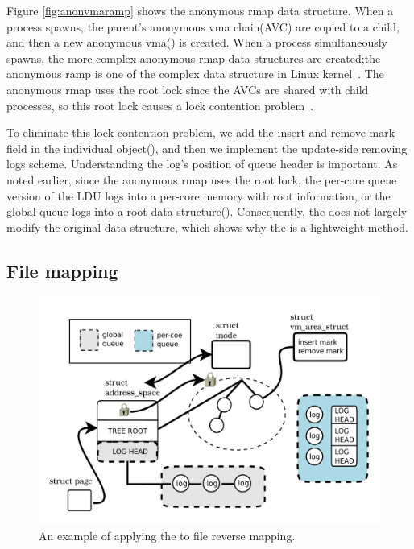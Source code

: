 Figure \ref{fig:anonvmaramp} shows the anonymous rmap data structure.
When a process spawns, the parent's anonymous vma chain(AVC) are copied
to a child, and then a new anonymous vma() is created.
When a process simultaneously spawns, the more complex
anonymous rmap data structures are created;the anonymous ramp is one of the complex data
structure in Linux kernel~\cite{CorbetLWNANON}.
The anonymous rmap uses the root lock since the AVCs are shared with child processes, so this root lock causes a lock contention problem~\cite{Andi2011adding}.

To eliminate this lock contention problem, we add the insert and
remove mark field in the individual object(),
and then we implement the update-side removing logs scheme.
Understanding the log's position of queue header is important.
As noted earlier, since the anonymous rmap uses the root lock, the per-core queue version of
the LDU logs into a per-core memory with root information, or the global
queue logs into a root data structure().
Consequently, the \LDU does not largely modify the original data
structure, which shows why the \LDU is a lightweight method.

\subsection{File mapping}

\begin{figure}[tb]
  \begin{center}
     \includegraphics[width=1\textwidth,height=1\textheight,keepaspectratio]{fig/file_rmap}
  \end{center}
  \caption{An example of applying the \LDU to file reverse mapping.}
  \label{fig:fileramp}
\end{figure}

